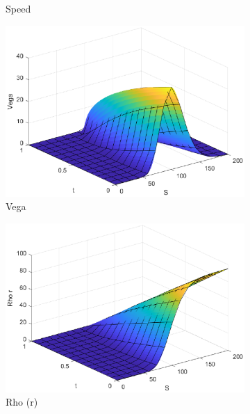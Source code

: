 \begin{figure}[H]
\begin{subfigure}[b]{0.35\linewidth}
        \caption{Speed}
    \end{subfigure}
    \begin{subfigure}[b]{0.35\linewidth}
        \includegraphics[width=\linewidth]{Imagenes/Parte1/6_Sols/Call/Call_Vega.eps}
        \caption{Vega}
    \end{subfigure}
    \begin{subfigure}[b]{0.35\linewidth}
        \includegraphics[width=\linewidth]{Imagenes/Parte1/6_Sols/Call/Call_Rho_r.eps}
        \caption{Rho (r)}
    \end{subfigure}
    \begin{subfigure}[b]{0.35\linewidth}

\end{subfigure}
\end{figure}

